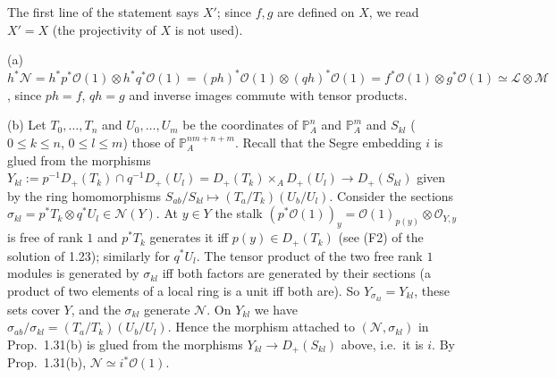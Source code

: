 \documentclass[11pt]{article}
\begin{document}
\pf
The first line of the statement says $X'$; since $f,g$ are defined on $X$, we read $X'=X$ (the projectivity of $X$ is not used).

(a) $h^*\mathcal{N}=h^*p^*\mathcal{O}(1)\otimes h^*q^*\mathcal{O}(1)=(ph)^*\mathcal{O}(1)\otimes(qh)^*\mathcal{O}(1)=f^*\mathcal{O}(1)\otimes g^*\mathcal{O}(1)\simeq\mathcal{L}\otimes\mathcal{M}$, since $ph=f$, $qh=g$ and inverse images commute with tensor products.

(b) Let $T_0,\dots,T_n$ and $U_0,\dots,U_m$ be the coordinates of $\mathbb{P}^n_A$ and $\mathbb{P}^m_A$ and $S_{kl}$ ($0\le k\le n$, $0\le l\le m$) those of $\mathbb{P}^{nm+n+m}_A$. Recall that the Segre embedding $i$ is glued from the morphisms $Y_{kl}:=p^{-1}D_+(T_k)\cap q^{-1}D_+(U_l)=D_+(T_k)\times_AD_+(U_l)\to D_+(S_{kl})$ given by the ring homomorphisms $S_{ab}/S_{kl}\mapsto(T_a/T_k)(U_b/U_l)$. Consider the sections $\sigma_{kl}=p^*T_k\otimes q^*U_l\in\mathcal{N}(Y)$. At $y\in Y$ the stalk $(p^*\mathcal{O}(1))_y=\mathcal{O}(1)_{p(y)}\otimes\mathcal{O}_{Y,y}$ is free of rank $1$ and $p^*T_k$ generates it iff $p(y)\in D_+(T_k)$ (see (F2) of the solution of 1.23); similarly for $q^*U_l$. The tensor product of the two free rank $1$ modules is generated by $\sigma_{kl}$ iff both factors are generated by their sections (a product of two elements of a local ring is a unit iff both are). So $Y_{\sigma_{kl}}=Y_{kl}$, these sets cover $Y$, and the $\sigma_{kl}$ generate $\mathcal{N}$. On $Y_{kl}$ we have $\sigma_{ab}/\sigma_{kl}=(T_a/T_k)(U_b/U_l)$. Hence the morphism attached to $(\mathcal{N},\sigma_{kl})$ in Prop.~1.31(b) is glued from the morphisms $Y_{kl}\to D_+(S_{kl})$ above, i.e.\ it is $i$. By Prop.~1.31(b), $\mathcal{N}\simeq i^*\mathcal{O}(1)$.
\end{document}
